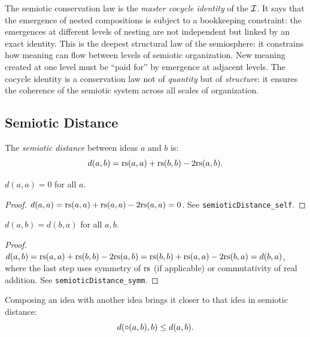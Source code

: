 \begin{interpretation}
The semiotic conservation law is the \emph{master cocycle identity} of
the $\mathcal{I}$. It says that the emergence of nested compositions is subject
to a bookkeeping constraint: the emergences at different levels of
nesting are not independent but linked by an exact identity. This is
the deepest structural law of the semiosphere: it constrains how
meaning can flow between levels of semiotic organization. New meaning
created at one level must be ``paid for'' by emergence at adjacent
levels. The cocycle identity is a conservation law not of
\emph{quantity} but of \emph{structure}: it ensures the coherence of
the semiotic system across all scales of organization.
\end{interpretation}

\subsection{Semiotic Distance}

\begin{definition}
\label{def:semiotic-distance}
The \emph{semiotic distance} between ideas $a$ and $b$ is:
\[
  d(a, b) = \mathrm{rs}(a, a) + \mathrm{rs}(b, b) - 2\mathrm{rs}(a, b).
\]
\end{definition}

\begin{theorem}
\label{thm:distance-self}
$d(a, a) = 0$ for all $a$.
\end{theorem}

\begin{proof}
$d(a, a) = \mathrm{rs}(a,a) + \mathrm{rs}(a,a) - 2\mathrm{rs}(a,a) = 0$. See
\texttt{semioticDistance\_self}.
\end{proof}

\begin{theorem}
\label{thm:distance-symm}
$d(a, b) = d(b, a)$ for all $a, b$.
\end{theorem}

\begin{proof}
$d(a,b) = \mathrm{rs}(a,a) + \mathrm{rs}(b,b) - 2\mathrm{rs}(a,b) = \mathrm{rs}(b,b) + \mathrm{rs}(a,a)
- 2\mathrm{rs}(b,a) = d(b,a)$, where the last step uses symmetry of $\mathrm{rs}$
(if applicable) or commutativity of real addition. See
\texttt{semioticDistance\_symm}.
\end{proof}

\begin{theorem}
\label{thm:composition-proximity}
Composing an idea with another idea brings it closer to that idea
in semiotic distance:
\[
  d(\circ(a, b), b) \leq d(a, b).
\]
\end{theorem}


